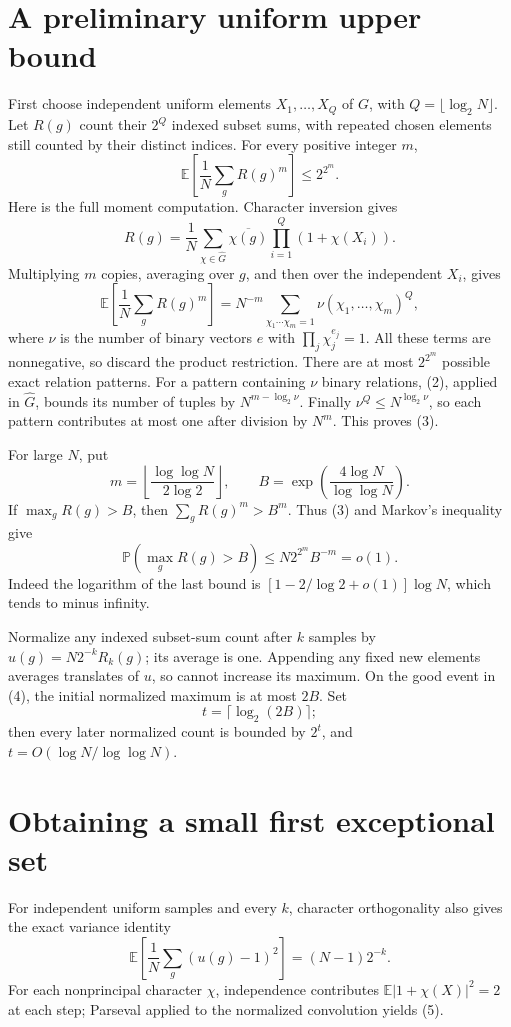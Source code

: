 \documentclass[11pt]{article}
\begin{document}
\section*{A preliminary uniform upper bound}
First choose independent uniform elements $X_1,\ldots,X_Q$ of $G$, with $Q=\lfloor\log_2N\rfloor$. Let $R(g)$ count their $2^Q$ indexed subset sums, with repeated chosen elements still counted by their distinct indices. For every positive integer $m$,
\[
 \mathbb E\left[\frac1N\sum_g R(g)^m\right]\le 2^{2^m}.\tag{3}
\]
Here is the full moment computation. Character inversion gives
\[
 R(g)=\frac1N\sum_{\chi\in\widehat G}\overline{\chi(g)}
                  \prod_{i=1}^Q(1+\chi(X_i)).
\]
Multiplying $m$ copies, averaging over $g$, and then over the independent $X_i$, gives
\[
 \mathbb E\left[\frac1N\sum_gR(g)^m\right]
 =N^{-m}\sum_{\chi_1\cdots\chi_m=1}\nu(\chi_1,\ldots,\chi_m)^Q,
\]
where $\nu$ is the number of binary vectors $e$ with $\prod_j\chi_j^{e_j}=1$. All these terms are nonnegative, so discard the product restriction. There are at most $2^{2^m}$ possible exact relation patterns. For a pattern containing $\nu$ binary relations, (2), applied in $\widehat G$, bounds its number of tuples by $N^{m-\log_2\nu}$. Finally $\nu^Q\le N^{\log_2\nu}$, so each pattern contributes at most one after division by $N^m$. This proves (3).

For large $N$, put
\[
 m=\left\lfloor\frac{\log\log N}{2\log2}\right\rfloor,
 \qquad B=\exp\left(\frac{4\log N}{\log\log N}\right).
\]
If $\max_gR(g)>B$, then $\sum_gR(g)^m>B^m$. Thus (3) and Markov's inequality give
\[
 \mathbb P(\max_gR(g)>B)\le N2^{2^m}B^{-m}=o(1).\tag{4}
\]
Indeed the logarithm of the last bound is
$[1-2/\log2+o(1)]\log N$, which tends to minus infinity.

Normalize any indexed subset-sum count after $k$ samples by $u(g)=N2^{-k}R_k(g)$; its average is one. Appending any fixed new elements averages translates of $u$, so cannot increase its maximum. On the good event in (4), the initial normalized maximum is at most $2B$. Set
\[
 t=\lceil\log_2(2B)\rceil;
\]
then every later normalized count is bounded by $2^t$, and $t=O(\log N/\log\log N)$.

\section*{Obtaining a small first exceptional set}
For independent uniform samples and every $k$, character orthogonality also gives the exact variance identity
\[
 \mathbb E\left[\frac1N\sum_g(u(g)-1)^2\right]=(N-1)2^{-k}.\tag{5}
\]
For each nonprincipal character $\chi$, independence contributes
$\mathbb E|1+\chi(X)|^2=2$ at each step; Parseval applied to the normalized convolution yields (5).
\end{document}
